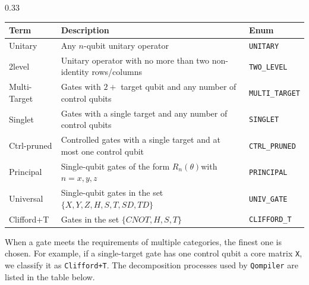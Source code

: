 \documentclass[final]{beamer}
\let\oldblock\block
\let\endoldblock\endblock
\renewenvironment{block}[1]{
    \vspace{2em} %
    \oldblock{#1}
    }{
    \endoldblock   %
}
\begin{document}
\begin{frame}[t]
\begin{columns}[t]
\begin{column}{0.33\textwidth}
\begin{block}{Methodology}
                    \vspace{2em}
                    \begin{tabularx}{.9\textwidth}{lXl}
                        \hline
                        \textbf{Term} & \textbf{Description}                                                           & \textbf{Enum}          \\
                        \hline
                        Unitary       & Any $n$-qubit unitary operator                                                 & \texttt{UNITARY}       \\
                        2level        & Unitary operator with no more than two non-identity rows/columns               & \texttt{TWO\_LEVEL}    \\
                        Multi-Target  & Gates with $2+$ target qubit and any number of control qubits                  & \texttt{MULTI\_TARGET} \\
                        Singlet       & Gates with a single target and any number of control qubits                    & \texttt{SINGLET}       \\
                        Ctrl-pruned   & Controlled gates with a single target and at most one control qubit            & \texttt{CTRL\_PRUNED}  \\
                        Principal     & Single-qubit gates of the form $R_n(\theta)$with $n=x,y,z$                     & \texttt{PRINCIPAL}     \\
                        Universal     & Single-qubit gates in the set $\{X, Y, Z, H, S, T, \mathit{SD}, \mathit{TD}\}$        & \texttt{UNIV\_GATE}    \\
                        Clifford+T    & Gates in the set $\{\mathit{CNOT}, H, S, T\}$                                  & \texttt{CLIFFORD\_T}   \\
                        \hline
                    \end{tabularx}
                    \vspace{2em}


                    When a gate meets the requirements of multiple categories, the finest one is chosen.
                    For example, if a single-target gate has one control qubit a core matrix \texttt{X},
                    we classify it as \texttt{Clifford+T}.
                    The decomposition processes used by \texttt{Qompiler} are listed in the table below.



\end{block}
\end{column}
\end{columns}
\end{frame}
\end{document}
